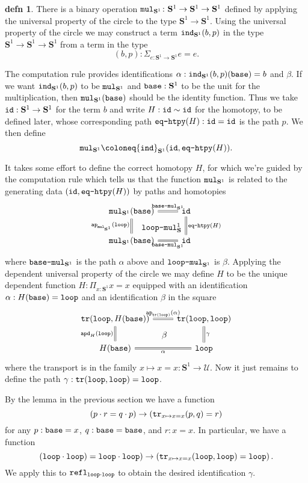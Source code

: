 \documentclass{amsart}
\theoremstyle{theorem}
\theoremstyle{definition}
\newtheorem*{defn}{defn}
\theoremstyle{remark}
\newcommand{\0}{\mathbbe{0}}
\newcommand{\1}{\mathbbe{1}}
\newcommand{\2}{\mathbbe{2}}
\newcommand{\3}{\mathbbe{3}}
\newcommand{\4}{\mathbbe{4}}
\newcommand{\term}[1]{{\textup{\texttt{#1}}}}
\newcommand{\id}{\term{id}}
\newcommand{\ind}{\term{ind}}
\newcommand{\refl}{\term{refl}}
\newcommand{\ap}{\term{ap}}
\newcommand{\tr}{\term{tr}}
\newcommand{\apd}{\term{apd}}
\newcommand{\UU}{{\mathcal{U}}}
\newcommand{\Sone}{\mathbf{S}^1}
\newcommand{\base}{\term{base}}
\newcommand{\lloop}{\term{loop}}
\newcommand{\mul}{\term{mul}}
\begin{document}
\begin{defn} There is a binary operation $\mul_{\Sone} \colon \Sone \to \Sone \to \Sone$ defined by applying the universal property of the circle to the type $\Sone \to \Sone$.  Using the universal property of the circle we may construct a term $\ind_{\Sone}(b,p)$ in the type $\Sone \to \Sone \to \Sone$ from a term in the type
 \[ (b,p) : \Sigma_{e : \Sone \to \Sone} e =e.\] 

 The computation rule provides identifications $\alpha : \ind_{\Sone}(b,p) (\base)= b$ and $\beta$. If we want $\ind_{\Sone}(b,p)$ to be $\mul_{\Sone}$ and $\base : \Sone$ to be the unit for the multiplication, then $\mul_{\Sone}(\base)$ should be the identity function. Thus we take $\id : \Sone \to \Sone$ for the term $b$ and write $H : \id \sim \id$ for the homotopy, to be defined later, whose corresponding path $\term{eq-htpy}(H) : \id = \id$ is the path $p$. We then define
 \[ \mul_{\Sone} \coloneq \ind_{\Sone}(\id,\term{eq-htpy}(H)).\]

 It takes some effort to define the correct homotopy $H$, for which we're guided by the computation rule which tells us that the function $\mul_{\Sone}$ is related to the generating data $(\id,\term{eq-htpy}(H))$ by paths and homotopies
 \[
   \begin{tikzcd}
     \mul_{\Sone}(\base) \arrow[r, equals, "\term{base-mul}_{\Sone}"] \arrow[d, equals, "\ap_{\mul_{\Sone}}(\lloop)"'] \arrow[dr, phantom, "\term{loop-mul}_\Sone"] & \id \arrow[d, equals, "\term{eq-htpy}(H)"] \\ 
     \mul_{\Sone}(\base) \arrow[r, equals, "\term{base-mul}_{\Sone}"'] & \id
   \end{tikzcd}\]
  where $\term{base-mul}_{\Sone}$ is the path $\alpha$ above and $\term{loop-mul}_{\Sone}$ is $\beta$. Applying the dependent universal property of the circle we may define $H$ to be the unique dependent function $H : \Pi_{x:\Sone} x =x$ equipped with an identification $\alpha : H(\base) = \lloop$ and an identification $\beta$ in the square
  \[\begin{tikzcd}
    \tr(\lloop, H(\base)) \arrow[d, equals, "\apd_H(\lloop)"'] \arrow[dr, phantom, "\beta"] \arrow[r, equals, "\ap_{\tr(\lloop)}(\alpha)"] & \tr(\lloop, \lloop) \arrow[d, equals, "\gamma"] \\ H(\base) \arrow[r, equals, "\alpha"'] & \lloop
  \end{tikzcd}\]
where the transport is in the family $x \mapsto x=x : \Sone \to \UU$. Now it just remains to define the path $\gamma : \tr(\lloop, \lloop) = \lloop$.
 
By the lemma in the previous section we have a function
\[ ( p \cdot r = q \cdot p) \to \left( \tr_{x \mapsto x = x} (p,q) =r \right)\]
for any $p : \base = x$, $q : \base = \base$, and $r : x = x$. In particular, we have a function
\[ ( \lloop \cdot \lloop) = \lloop \cdot \lloop) \to \left( \tr_{x \mapsto x = x} (\lloop,\lloop) =\lloop \right).\] We apply this to $\refl_{\lloop\cdot\lloop}$ to obtain the desired identification $\gamma$.
\end{defn}
\end{document}
